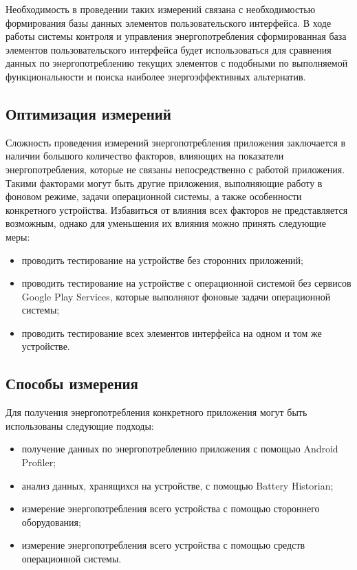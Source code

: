 \documentclass[a4paper,14pt]{extarticle} %
\begin{document}
	Необходимость в проведении таких измерений связана с необходимостью формирования базы данных элементов пользовательского интерфейса. В ходе работы системы контроля и управления энергопотребления  сформированная база элементов пользовательского интерфейса будет использоваться для сравнения данных по энергопотреблению текущих элементов с подобными по выполняемой функциональности и поиска наиболее энергоэффективных альтернатив.
	
	\subsection{Оптимизация измерений}
	
	Сложность проведения измерений энергопотребления приложения заключается в наличии большого количество факторов, влияющих на показатели энергопотребления, которые не связаны непосредственно с работой приложения. Такими факторами могут быть другие приложения, выполняющие работу в фоновом режиме, задачи операционной системы, а также особенности конкретного устройства. Избавиться от влияния всех факторов не представляется возможным, однако для уменьшения их влияния можно принять следующие меры:
	\begin{itemize}
		\item проводить тестирование на устройстве без сторонних приложений;
		\item проводить тестирование на устройстве с операционной системой без сервисов Google Play Services, которые выполняют фоновые задачи операционной системы;
		\item проводить тестирование всех элементов интерфейса на одном и том же устройстве.
	\end{itemize}
	
	\subsection{Способы измерения}
	
	Для получения энергопотребления конкретного приложения могут быть использованы следующие подходы:
	\begin{itemize}
		\item получение данных по энергопотреблению приложения с помощью Android Profiler;
		\item анализ данных, хранящихся на устройстве, с помощью Battery Historian;
		\item измерение энергопотребления всего устройства с помощью стороннего оборудования;
		\item измерение энергопотребления всего устройства с помощью средств операционной системы.
	\end{itemize}
	
\end{document}
